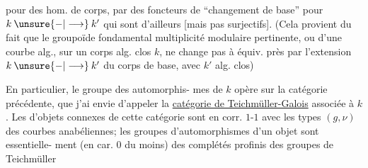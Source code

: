 pour des hom. de corps, par des foncteurs
de ``changement de base'' pour $k\mathbin{\unsure{-|\longrightarrow}}k'$
qui sont d'ailleurs   [mais
pas  surjectifs]. (Cela provient
du fait que le groupoïde fondamental
   multiplicité modulaire pertinente,
ou d'une courbe alg., sur un corps alg.
clos $k$, ne change pas à équiv. près
par l'extension $k\mathbin{\unsure{-|\longrightarrow}}k'$ du corps de base,
avec $k'$ alg. clos) 

En particulier, le groupe des automorphis-
mes de $k$ opère sur la catégorie précédente,
que j'ai envie d'appeler la \uline{catégorie de
Teichmüller-Galois} associée à $k$. Les
  d'objets connexes de cette
catégorie sont en corr. $1$-$1$ avec les types
$(g,\nu)$ des courbes anabéliennes; les groupes
d'automorphismes d'un objet sont essentielle-
ment (en car. $0$ du moins) des complétés
profinis des groupes de Teichmüller 
